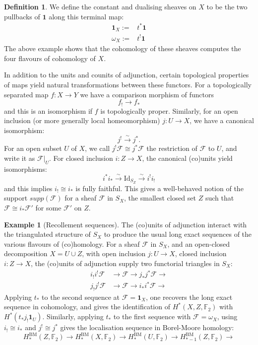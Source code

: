 \documentclass{amsart}
\theoremstyle{definition}
\newtheorem{defi}[thm]{Definition}
\newtheorem{ex}[thm]{Example}
\theoremstyle{remark}
\begin{document}
\begin{defi}
We define the constant and dualising sheaves on $X$ to be the two pullbacks of $\mathbf{1}$ along this terminal map:
\begin{align*}
    \mathbf{1}_X:=&t^*\mathbf{1}\\
    \omega_X:=&t^!\mathbf{1}
\end{align*}
The above example shows that the cohomology of these sheaves computes the four flavours of cohomology of $X$.
\end{defi}
In addition to the units and counits of adjunction, certain topological properties of maps yield natural transformations between these functors. For a topologically separated map $f:X\to Y$ we have a comparison morphism of functors \[f_!\to f_*\] and this is an isomorphism if $f$ is topologically proper. Similarly, for an open inclusion (or more generally local homeomorphism) $j:U\to X$, we have a canonical isomorphism: \[j^!\xrightarrow{\sim} j^*.\] For an open subset $U$ of $X$, we call  $j^!\mathcal{F}\cong j^*\mathcal{F}$ the restriction of $\mathcal{F}$ to $U$, and write it as $\mathcal{F}|_U$. For closed inclusion $i:Z\to X$, the canonical (co)units yield isomorphisms: \[i^*i_*\xrightarrow{\sim}\text{Id}_{S_Z}\xrightarrow{\sim} i^!i_!\] and this implies $i_!\cong i_*$ is fully faithful. This gives a well-behaved notion of the support $supp(\mathcal{F})$ for a sheaf $\mathcal{F}$ in $S_X$, the smallest closed set $Z$ such that $\mathcal{F}\cong i_*\mathcal{F}'$ for some $\mathcal{F}'$ on $Z$.
\begin{ex}[Recollement sequences]\label{Ex:Recollement sequences}
The (co)units of adjunction interact with the triangulated structure of $S_X$ to produce the usual long exact sequences of the various flavours of (co)homology. For a sheaf $\mathcal{F}$ in $S_X$, and an open-closed decomposition $X=U\cup Z$, with open inclusion $j:U\to X$, closed inclusion $i:Z\to X$, the (co)units of adjunction supply two functorial triangles in $S_X$:
\begin{align*}
    i_!i^!\mathcal{F}&\to \mathcal{F}\to j_*j^*\mathcal{F}\to\\
    j_!j^!\mathcal{F}&\to \mathcal{F}\to i_*i^*\mathcal{F}\to
\end{align*}
Applying $t_*$ to the second sequence at $\mathcal{F}=\mathbf{1}_X$, one recovers the long exact sequence in cohomology, and gives the identification of $H^*(X,Z,\mathbb{F}_2)$ with $H^*(t_*j_!\mathbf{1}_U)$. Similarly, applying $t_*$ to the first sequence with $\mathcal{F}=\omega_X$, using $i_!\cong i_*$ and $j^!\cong j^*$ gives the localisation sequence in Borel-Moore homology:
\[H^{\mathrm{BM}}_*(Z,\mathbb{F}_2)\to H^{\mathrm{BM}}_*(X,\mathbb{F}_2)\to H^{\mathrm{BM}}_*(U,\mathbb{F}_2)\to H^{\mathrm{BM}}_{\ast-1}(Z,\mathbb{F}_2)\to\]
\end{ex}
\end{document}
